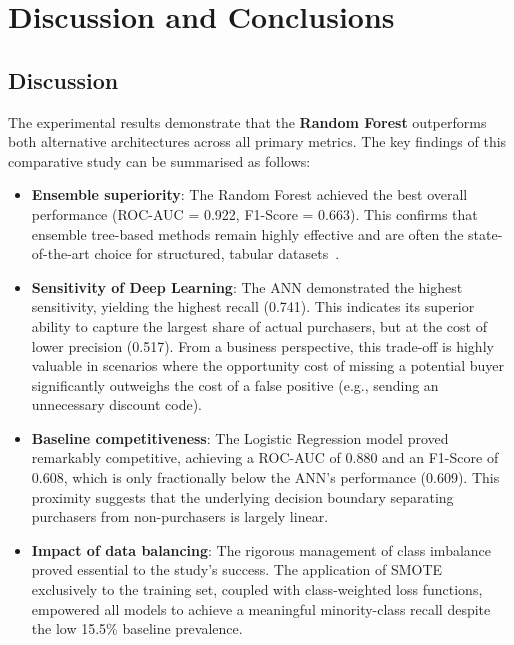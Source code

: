 \section{Discussion and Conclusions}

\subsection{Discussion}

The experimental results demonstrate that the \textbf{Random Forest} outperforms both alternative architectures across all primary metrics. The key findings of this comparative study can be summarised as follows:

\begin{itemize}
    \item \textbf{Ensemble superiority}: The Random Forest achieved the best overall performance (ROC-AUC = 0.922, F1-Score = 0.663). This confirms that ensemble tree-based methods remain highly effective and are often the state-of-the-art choice for structured, tabular datasets~\cite{grinsztajn2022}.
    
    \item \textbf{Sensitivity of Deep Learning}: The ANN demonstrated the highest sensitivity, yielding the highest recall (0.741). This indicates its superior ability to capture the largest share of actual purchasers, but at the cost of lower precision (0.517). From a business perspective, this trade-off is highly valuable in scenarios where the opportunity cost of missing a potential buyer significantly outweighs the cost of a false positive (e.g., sending an unnecessary discount code).
    
    \item \textbf{Baseline competitiveness}: The Logistic Regression model proved remarkably competitive, achieving a ROC-AUC of 0.880 and an F1-Score of 0.608, which is only fractionally below the ANN's performance (0.609). This proximity suggests that the underlying decision boundary separating purchasers from non-purchasers is largely linear.
    
    \item \textbf{Impact of data balancing}: The rigorous management of class imbalance proved essential to the study's success. The application of SMOTE exclusively to the training set, coupled with class-weighted loss functions, empowered all models to achieve a meaningful minority-class recall despite the low 15.5\% baseline prevalence.
\end{itemize}

